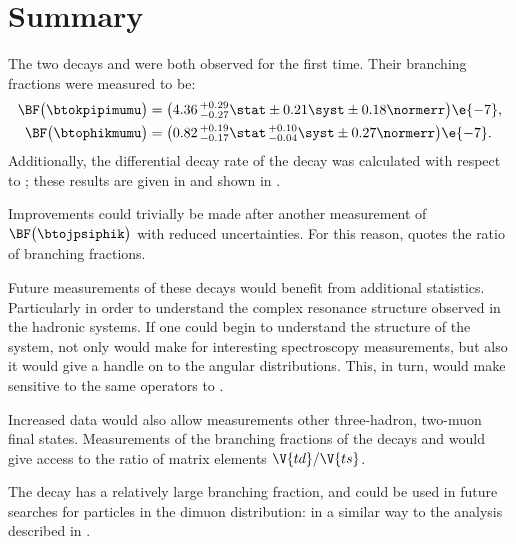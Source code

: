 \section{Summary}
\label{sec:hhh:conc}

The two \fcnc decays \btokpipimumu and \btophikmumu were both observed for the first time.
Their branching fractions were measured to be:
\begin{align*}
  \BF\big( \btokpipimumu \big)&=
  \big(4.36\,^{+0.29}_{-0.27}\stat\pm0.21\syst\pm0.18\normerr\big)\e{-7}, \\
  \BF\big(\btophikmumu\big)&=
  \big(0.82\,^{+0.19}_{-0.17}\stat\,^{+0.10}_{-0.04}\syst\pm0.27\normerr\big)\e{-7}.
\end{align*}
Additionally, the differential decay rate of the decay \btokpipimumu was calculated with respect to
\qsq; these results are given in  and shown in .

Improvements could trivially be made after another measurement of
$\BF\big(\btojpsiphik\big)$ with reduced uncertainties.
For this reason,  quotes the ratio of branching fractions.

Future measurements of these decays would benefit from additional statistics.
Particularly in order to understand the complex resonance structure observed in the hadronic
systems.
If one could begin to understand the structure of the \kpipi system, not only would make for
interesting spectroscopy measurements, but also it would give a handle on to the \kpipi angular
distributions.
This, in turn, would make \btokpipimumu sensitive to the same operators to \btokstrmumu.

Increased data would also allow measurements other three-hadron, two-muon final states.
Measurements of the branching fractions of the decays \decay{\Bp}{\pip\pipi\mumu} and
\decay{\Bp}{\kk\pip\mumu} would give access to the ratio of \ckm matrix elements $\V{td}/\V{ts}$.

The decay \btokpipimumu has a relatively large branching fraction, and could be used in future
searches for \np particles in the dimuon distribution: in a similar way to the analysis described
in .




